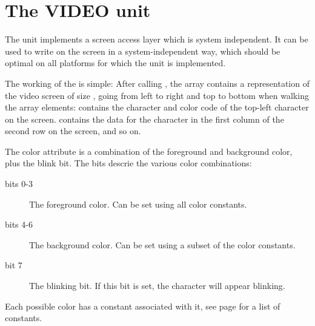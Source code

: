 %
%
%
%
%
%
\chapter{The VIDEO unit}

The  unit implements a screen access layer which is system
independent. It can be used to write on the screen in a system-independent
way, which should be optimal on all platforms for which the unit is
implemented.

The working of the  is simple: After calling ,
the array  contains a representation of the video screen of
size , going from left to right and top to
bottom when walking the array elements:  contains the 
character and color code of the top-left character on the screen.
 contains the data for the character in the
first column of the second row on the screen, and so on.

The color attribute is a combination of the foreground and background color,
plus the blink bit. The bits descrie the various color combinations:
\begin{description}
\item[bits 0-3] The foreground color. Can be set using all color constants. 
\item[bits 4-6] The background color. Can be set using a subset of the
color constants.
\item[bit 7] The blinking bit. If this bit is set, the character will appear
blinking.
\end{description}
Each possible color has a constant associated with it, see page
\pageref{vidcolorconst} for a list of constants.

